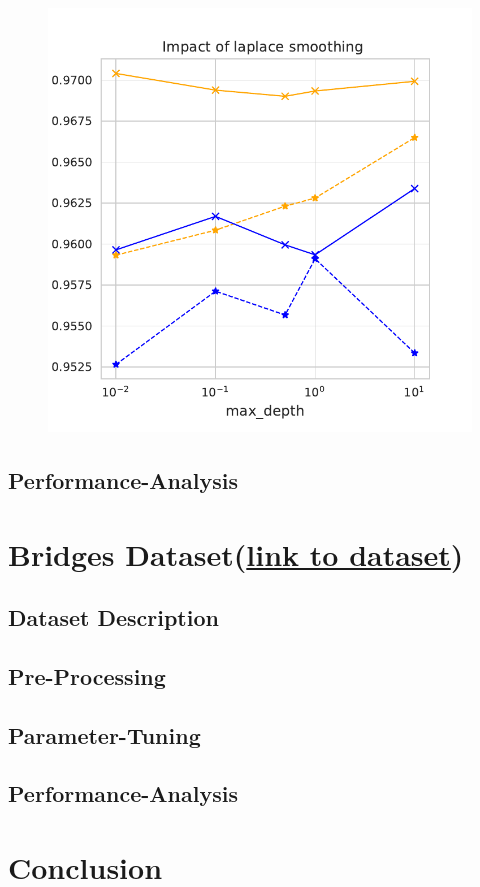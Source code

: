 \documentclass[11pt]{article}
\begin{document}
\begin{figure}
\begin{minipage}[l]{0.3\textwidth}
\end{minipage}
\begin{minipage}[l]{0.3\textwidth}
\includegraphics[width=1\linewidth]{email_spam/nb_smoother.pdf}
\end{minipage}
   \caption{}
\label{spamfig_fig3}
\end{figure}

\subsection{Performance-Analysis}


\section{Bridges Dataset(\href{https://archive.ics.uci.edu/ml/datasets/Pittsburgh+Bridges}{link to dataset})}
\subsection{Dataset Description}
\subsection{Pre-Processing}
\subsection{Parameter-Tuning}
\subsection{Performance-Analysis}

\section{Conclusion}

\newpage


\end{document}
